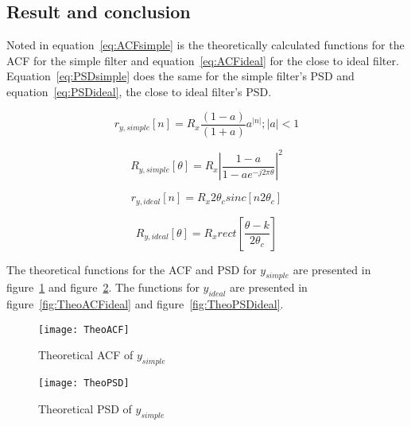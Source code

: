 \documentclass[10pt]{article}
\begin{document}
\subsection{Result and conclusion}

Noted in equation~\ref{eq:ACFsimple} is the theoretically calculated functions
for the ACF for the simple filter and equation~\ref{eq:ACFideal} for the close
to ideal filter.
Equation~\ref{eq:PSDsimple} does the same for the simple filter's PSD
and equation~\ref{eq:PSDideal}, the close to ideal filter's PSD.

\begin{equation}
  \label{eq:ACFsimple}
  r_{y,simple}[n] = R_x\frac{(1-a)}{(1+a)}a^{|n|};  |a| < 1
\end{equation}

\begin{equation}
  \label{eq:PSDsimple}
  R_{y,simple}[\theta] =  R_x|\frac{1-a}{1-ae^{-j2\pi\theta}}|^2
\end{equation}

\begin{equation}
  \label{eq:ACFideal}
  r_{y,ideal}[n] = R_x2\theta_csinc[n2\theta_c]
\end{equation}

\begin{equation}
  \label{eq:PSDideal}
  R_{y,ideal}[\theta] = R_xrect[\frac{\theta - k}{2\theta_c}]
\end{equation}


The theoretical functions for the ACF and PSD for $y_{simple}$ are presented
in figure~\ref{fig:TheoACFsimple} and figure~\ref{fig:TheoPSDsimple}.
The functions for $y_{ideal}$ are presented in figure~\ref{fig:TheoACFideal} and
figure~\ref{fig:TheoPSDideal}.



\begin{figure}[!hp]

    \begin{center}
      \texttt{[image: TheoACF]}
    \caption{Theoretical ACF of $y_{simple}$ \label{fig:TheoACFsimple}}
    \end{center}

\end{figure}

\begin{figure}[!hp]

    \begin{center}
      \texttt{[image: TheoPSD]}
    \caption{Theoretical PSD of $y_{simple}$ \label{fig:TheoPSDsimple}}
    \end{center}

\end{figure}
\end{document}
